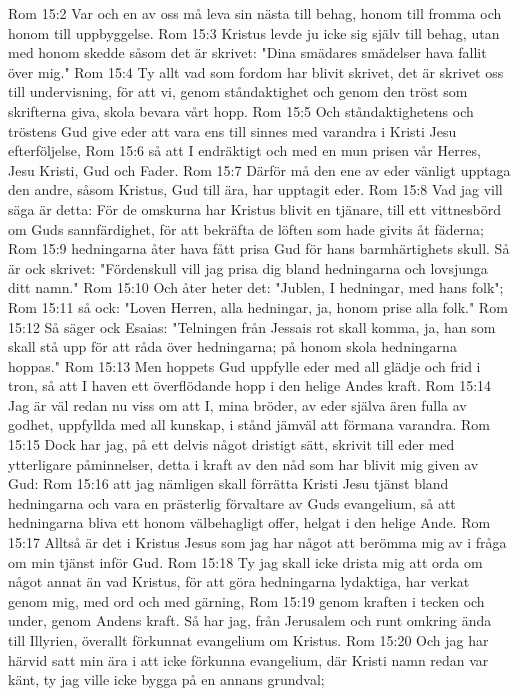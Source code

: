 Rom 15:2  Var och en av oss må leva sin nästa till behag, honom till fromma och honom till uppbyggelse.
Rom 15:3  Kristus levde ju icke sig själv till behag, utan med honom skedde såsom det är skrivet: "Dina smädares smädelser hava fallit över mig."
Rom 15:4  Ty allt vad som fordom har blivit skrivet, det är skrivet oss till undervisning, för att vi, genom ståndaktighet och genom den tröst som skrifterna giva, skola bevara vårt hopp.
Rom 15:5  Och ståndaktighetens och tröstens Gud give eder att vara ens till sinnes med varandra i Kristi Jesu efterföljelse,
Rom 15:6  så att I endräktigt och med en mun prisen vår Herres, Jesu Kristi, Gud och Fader.
Rom 15:7  Därför må den ene av eder vänligt upptaga den andre, såsom Kristus, Gud till ära, har upptagit eder.
Rom 15:8  Vad jag vill säga är detta: För de omskurna har Kristus blivit en tjänare, till ett vittnesbörd om Guds sannfärdighet, för att bekräfta de löften som hade givits åt fäderna;
Rom 15:9  hedningarna åter hava fått prisa Gud för hans barmhärtighets skull. Så är ock skrivet: "Fördenskull vill jag prisa dig bland hedningarna och lovsjunga ditt namn."
Rom 15:10  Och åter heter det: "Jublen, I hedningar, med hans folk";
Rom 15:11  så ock: "Loven Herren, alla hedningar, ja, honom prise alla folk."
Rom 15:12  Så säger ock Esaias: "Telningen från Jessais rot skall komma, ja, han som skall stå upp för att råda över hedningarna; på honom skola hedningarna hoppas."
Rom 15:13  Men hoppets Gud uppfylle eder med all glädje och frid i tron, så att I haven ett överflödande hopp i den helige Andes kraft.
Rom 15:14  Jag är väl redan nu viss om att I, mina bröder, av eder själva ären fulla av godhet, uppfyllda med all kunskap, i stånd jämväl att förmana varandra.
Rom 15:15  Dock har jag, på ett delvis något dristigt sätt, skrivit till eder med ytterligare påminnelser, detta i kraft av den nåd som har blivit mig given av Gud:
Rom 15:16  att jag nämligen skall förrätta Kristi Jesu tjänst bland hedningarna och vara en prästerlig förvaltare av Guds evangelium, så att hedningarna bliva ett honom välbehagligt offer, helgat i den helige Ande.
Rom 15:17  Alltså är det i Kristus Jesus som jag har något att berömma mig av i fråga om min tjänst inför Gud.
Rom 15:18  Ty jag skall icke drista mig att orda om något annat än vad Kristus, för att göra hedningarna lydaktiga, har verkat genom mig, med ord och med gärning,
Rom 15:19  genom kraften i tecken och under, genom Andens kraft. Så har jag, från Jerusalem och runt omkring ända till Illyrien, överallt förkunnat evangelium om Kristus.
Rom 15:20  Och jag har härvid satt min ära i att icke förkunna evangelium, där Kristi namn redan var känt, ty jag ville icke bygga på en annans grundval;
